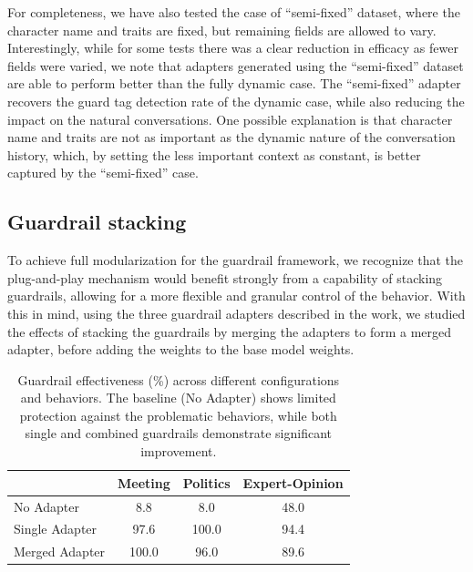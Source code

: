\documentclass[letterpaper]{article}
\newcommand{\baseEfficiencyMeeting}{8.8}
\newcommand{\baseEfficiencyPolitics}{8.0}
\newcommand{\baseEfficiencyExpert}{48.0}
\newcommand{\guardrailEfficiencyMeeting}{97.6}
\newcommand{\guardrailEfficiencyPolitics}{100.0}
\newcommand{\guardrailEfficiencyExpert}{94.4}
\newcommand{\guardrailMergedEfficiencyMeeting}{100.0}
\newcommand{\guardrailMergedEfficiencyPolitics}{96.0}
\newcommand{\guardrailMergedEfficiencyExpert}{89.6}
\begin{document}
For completeness, we have also tested the case of ``semi-fixed'' dataset, where the character name and traits are fixed, but remaining fields are allowed to vary. 
Interestingly, while for some tests there was a clear reduction in efficacy as fewer fields were varied, we note that adapters generated using the ``semi-fixed'' dataset are able to perform better than the fully dynamic case. The ``semi-fixed'' adapter recovers the guard tag detection rate of the dynamic case, while also reducing the impact on the natural conversations.
One possible explanation is that character name and traits are not as important as the dynamic nature of the conversation history, which, by setting the less important context as constant, is better captured by the ``semi-fixed'' case.

\subsection{Guardrail stacking}
To achieve full modularization for the guardrail framework, we recognize that the plug-and-play mechanism would benefit strongly from a capability of stacking guardrails, allowing for a more flexible and granular control of the behavior. 
With this in mind, using the three guardrail adapters described in the work, we studied the effects of stacking the guardrails by merging the adapters to form a merged adapter, before adding the weights to the base model weights. 

\begin{table}[ht]
	\centering
	\begin{tabular}{lccc}
		\toprule
		& Meeting & Politics & Expert-Opinion \\
		\midrule
		No Adapter & \baseEfficiencyMeeting & \baseEfficiencyPolitics & \baseEfficiencyExpert \\
		Single Adapter & \guardrailEfficiencyMeeting & \guardrailEfficiencyPolitics & \guardrailEfficiencyExpert \\
		Merged Adapter & \guardrailMergedEfficiencyMeeting & \guardrailMergedEfficiencyPolitics & \guardrailMergedEfficiencyExpert \\
		\bottomrule
	\end{tabular}
	\caption{Guardrail effectiveness (\%) across different configurations and behaviors. The baseline (No Adapter) shows limited protection against the problematic behaviors, while both single and combined guardrails demonstrate significant improvement.}
	\label{tab:guardrail-effectiveness}
\end{table}
\end{document}
